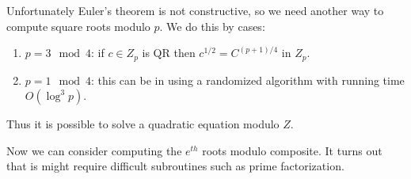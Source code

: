 \documentclass[twoside]{article}
\begin{document}
Unfortunately Euler's theorem is not constructive, so we need another way to compute square roots modulo $p$. We do this by cases:
\begin{enumerate}
\item $p = 3 \mod 4$: if $c \in Z_p$ is QR then $c^{1/2} = C^{(p+1)/4}$ in $Z_p$.
\item $p = 1 \mod 4$: this can be in using a randomized algorithm with running time $O(\log^3 p)$. 
\end{enumerate}

Thus it is possible to solve a quadratic equation modulo $Z$. 

Now we can consider computing the $e^{th}$ roots modulo composite. It turns out that is might require difficult subroutines such as prime factorization.
\end{document}
